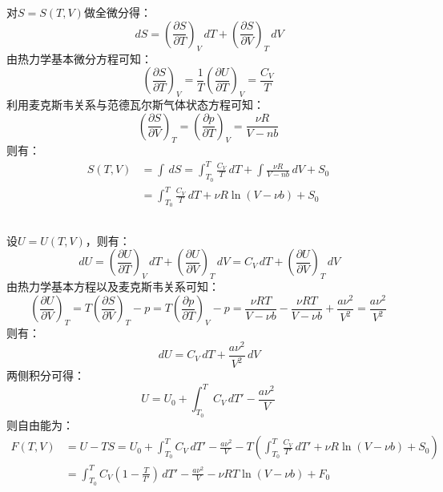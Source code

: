 \documentclass[a4paper,12pt]{article}
\begin{document}
\section{}
\subsection{}
对$S=S(T,V)$做全微分得：
\begin{equation}\nonumber
	\,dS = \left(\frac{\partial S}{\partial T}\right)_V\,dT + \left(\frac{\partial S}{\partial V}\right)_T\,dV
\end{equation}
由热力学基本微分方程可知：
\begin{equation}\nonumber
	\left(\frac{\partial S}{\partial T}\right)_V = \frac{1}{T}\left(\frac{\partial U}{\partial T}\right)_V = \frac{C_V}{T}
\end{equation}
利用麦克斯韦关系与范德瓦尔斯气体状态方程可知：
\begin{equation}\nonumber
	\left(\frac{\partial S}{\partial V}\right)_T = \left(\frac{\partial p}{\partial T}\right)_V = \frac{\nu R}{V-nb}
\end{equation}
则有：
\begin{equation}\nonumber
\begin{aligned}
	S(T,V) &= \int \,dS = \int_{T_0}^{T} \frac{C_V}{T}\,dT + \int \frac{\nu R}{V-nb}\,dV + S_0 \\
	&= \int_{T_0}^{T} \frac{C_V}{T}\,dT + \nu R\ln(V-\nu b) + S_0
\end{aligned}
\end{equation}
\subsection{}
设$U=U(T,V)$，则有：
\begin{equation}\nonumber
	\,dU= \left(\frac{\partial U}{\partial T}\right)_V \,dT + \left(\frac{\partial U}{\partial V}\right)_T \,dV = C_V \,dT + \left(\frac{\partial U}{\partial V}\right)_T \,dV
\end{equation}
由热力学基本方程以及麦克斯韦关系可知：
\begin{equation}\nonumber
	\left(\frac{\partial U}{\partial V}\right)_T = T\left(\frac{\partial S}{\partial V}\right)_T - p = T\left(\frac{\partial p}{\partial T}\right)_V - p = \frac{\nu RT}{V-\nu b} - \frac{\nu RT}{V-\nu b} + \frac{a\nu^2}{V^2} = \frac{a\nu^2}{V^2}
\end{equation}
则有：
\begin{equation}\nonumber
	\,dU = C_V \,dT + \frac{a\nu^2}{V^2} \,dV
\end{equation}
两侧积分可得：
\begin{equation}\nonumber
	U = U_0 + \int_{T_0}^{T} C_V \,dT' - \frac{a\nu^2}{V}
\end{equation}
则自由能为：
\begin{equation}\nonumber
\begin{aligned}
	F(T,V) & = U - TS = U_0 + \int_{T_0}^{T} C_V \,dT' - \frac{a\nu^2}{V} - T\left(\int_{T_0}^{T} \frac{C_V}{T'}\,dT' + \nu R\ln(V-\nu b) + S_0\right) \\
	& = \int_{T_0}^{T}C_V\left(1-\frac{T}{T'}\right)\,dT' - \frac{a\nu^2}{V} -\nu RT\ln(V-\nu b) + F_0
\end{aligned}
\end{equation}
\end{document}
